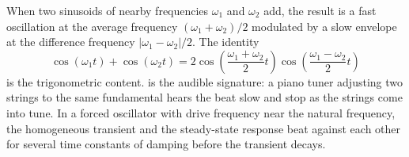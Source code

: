 When two sinusoids of nearby frequencies $\omega_{1}$ and
$\omega_{2}$ add, the result is a fast oscillation at the average
frequency $(\omega_{1} + \omega_{2})/2$ modulated by a slow envelope
at the difference frequency $|\omega_{1} - \omega_{2}|/2$. The
identity
\[
\cos(\omega_{1} t) + \cos(\omega_{2} t) = 2 \cos\!\left(\frac{\omega_{1} + \omega_{2}}{2} t\right) \cos\!\left(\frac{\omega_{1} - \omega_{2}}{2} t\right)
\]
is the trigonometric content.  is the audible
signature: a piano tuner adjusting two strings to the same
fundamental hears the beat slow and stop as the strings come into
tune. In a forced oscillator with drive frequency near the natural
frequency, the homogeneous transient and the steady-state response
beat against each other for several time constants of damping
before the transient decays.

